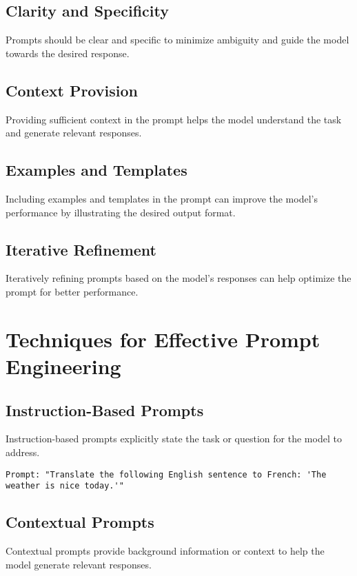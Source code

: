 \subsection{Clarity and Specificity}
Prompts should be clear and specific to minimize ambiguity and guide the model towards the desired response.

\subsection{Context Provision}
Providing sufficient context in the prompt helps the model understand the task and generate relevant responses.

\subsection{Examples and Templates}
Including examples and templates in the prompt can improve the model's performance by illustrating the desired output format.

\subsection{Iterative Refinement}
Iteratively refining prompts based on the model's responses can help optimize the prompt for better performance.

\section{Techniques for Effective Prompt Engineering}

\subsection{Instruction-Based Prompts}
Instruction-based prompts explicitly state the task or question for the model to address.

\begin{verbatim}
Prompt: "Translate the following English sentence to French: 'The weather is nice today.'"
\end{verbatim}

\subsection{Contextual Prompts}
Contextual prompts provide background information or context to help the model generate relevant responses.


